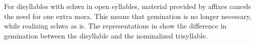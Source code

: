 
For disyllables with schwa in open syllables, material provided by affixes cancels the need for one extra mora. This means that gemination is no longer necessary, while realizing schwa as  is. The representations in   show the difference in gemination between the disyllable and the nominalized  trisyllable.

